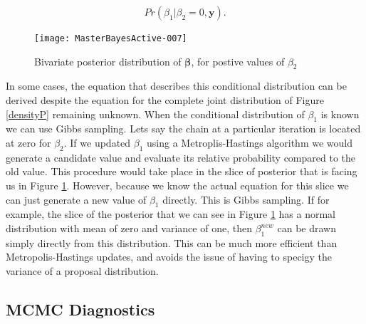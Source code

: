 \documentclass{article}
\begin{document}
\begin{equation}
Pr(\beta_{1}|\beta_{2}=0, \bm{y}).
\end{equation}

\begin{figure}[!h]
\begin{center}
\texttt{[image: MasterBayesActive-007]}
\end{center}
\caption{Bivariate posterior distribution of $\bm{\beta}$, for postive values of $\beta_{2}$}
\label{densityPgibbs}
\end{figure}

 In some cases, the equation that describes this conditional distribution can be derived despite the equation for the complete joint distribution of Figure \ref{densityP} remaining unknown.  When the conditional distribution of $\beta_{1}$ is known we can use Gibbs sampling. Lets say the chain at a particular iteration is located at zero for $\beta_{2}$.  If we updated $\beta_{1}$ using a Metroplis-Hastings algorithm we would generate a candidate value and evaluate its relative probability compared to the old value.  This procedure would take place in the slice of posterior that is facing us in Figure \ref{densityPgibbs}. However, because we know the actual equation for this slice we can just generate a new value of $\beta_{1}$ directly. This is Gibbs sampling.  If for example, the slice of the posterior that we can see in Figure \ref{densityPgibbs} has a normal distribution with mean of zero and variance of one, then $\beta_{1}^{new}$ can be drawn simply directly from this distribution. This can be much more efficient than Metropolis-Hastings updates, and avoids the issue of having to specigy the variance of a proposal distribution.\\

\subsection{MCMC Diagnostics}
\label{MCMC.D-sec}
\end{document}
